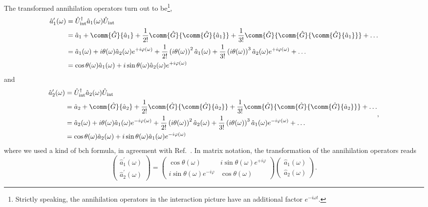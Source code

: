 The transformed annihilation operators turn out to be\footnote{Strictly speaking, the annihilation operators in the interaction picture have an additional factor $e^{-i\omega t}$.},
\begin{equation}
	\begin{split}
		\hat{a}_1^\prime(\omega)
		&=
		\hat{U}_\text{int}^\dagger
		\hat{a}_1(\omega)
		\hat{U}_\text{int}
		\\
		&=
		\hat{a}_1
		+
		\comm{\hat{G}}{\hat{a}_1}
		+
		\frac{1}{2!}
		\comm{\hat{G}}{\comm{\hat{G}}{\hat{a}_1}}
		+
		\frac{1}{3!}
		\comm{\hat{G}}{\comm{\hat{G}}{\comm{\hat{G}}{\hat{a}_1}}}
		+
		\dots
		\\
		&=
		\hat{a}_1(\omega)
		+
		i\theta(\omega)
		\hat{a}_2(\omega)
		e^{+i\varphi(\omega)}
		+
		\frac{1}{2!}
		\left(i\theta(\omega)\right)^2
		\hat{a}_1(\omega)
		+
		\frac{1}{3!}
		\left(i\theta(\omega)\right)^3
		\hat{a}_2(\omega)
		e^{+i\varphi(\omega)}
		+
		\dots
		\\
		&=
		\cos\theta(\omega)
		\hat{a}_1(\omega)
		+
		i\sin\theta(\omega)
		\hat{a}_2(\omega)
		e^{+i\varphi(\omega)}
	\end{split}
\end{equation}
and
\begin{equation}
	\begin{split}
		\hat{a}_2^\prime(\omega)
		&=
		\hat{U}_\text{int}^\dagger
		\hat{a}_2(\omega)
		\hat{U}_\text{int}
		\\
		&=
		\hat{a}_2
		+
		\comm{\hat{G}}{\hat{a}_2}
		+
		\frac{1}{2!}
		\comm{\hat{G}}{\comm{\hat{G}}{\hat{a}_2}}
		+
		\frac{1}{3!}
		\comm{\hat{G}}{\comm{\hat{G}}{\comm{\hat{G}}{\hat{a}_2}}}
		+
		\dots
		\\
		&=
		\hat{a}_2(\omega)
		+
		i\theta(\omega)
		\hat{a}_1(\omega)
		e^{-i\varphi(\omega)}
		+
		\frac{1}{2!}
		\left(i\theta(\omega)\right)^2
		\hat{a}_2(\omega)
		+
		\frac{1}{3!}
		\left(i\theta(\omega)\right)^3
		\hat{a}_1(\omega)
		e^{-i\varphi(\omega)}
		+
		\dots
		\\
		&=
		\cos\theta(\omega)
		\hat{a}_2(\omega)
		+
		i\sin\theta(\omega)
		\hat{a}_1(\omega)
		e^{-i\varphi(\omega)}
	\end{split}
	,
\end{equation}
where we used a kind of \gls{bch} formula, in agreement with Ref.~\cite[p.~131]{Haroche2006}.
In matrix notation, the transformation of the annihilation operators reads
\begin{equation}
	\begin{pmatrix}
        \hat{a}_1^\prime(\omega) \\
        \hat{a}_2^\prime(\omega)
    \end{pmatrix}
    =
    \begin{pmatrix}
        \cos\theta(\omega) & i\sin\theta(\omega)e^{+i\varphi} 
        \\
        i\sin\theta(\omega)e^{-i\varphi} & \cos\theta(\omega)
    \end{pmatrix}
    \begin{pmatrix}
        \hat{a}_1(\omega) \\
        \hat{a}_2(\omega)
    \end{pmatrix}
    \label{eq:waveguide_coupler_transformation}
    .
\end{equation}
